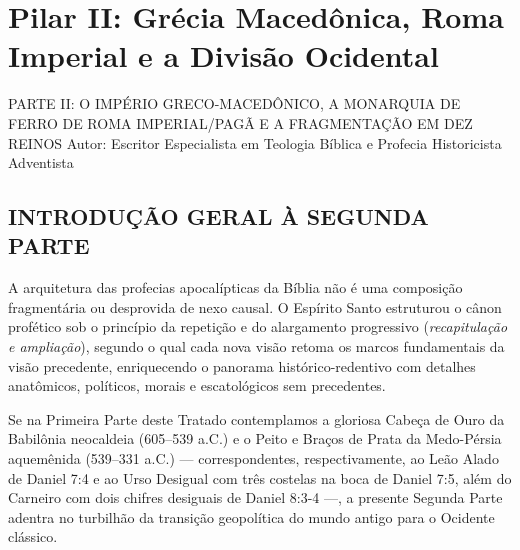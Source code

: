 \chapter{Pilar II: Grécia Macedônica, Roma Imperial e a Divisão Ocidental}

PARTE II: O IMPÉRIO GRECO-MACEDÔNICO, A MONARQUIA DE FERRO DE ROMA IMPERIAL/PAGÃ E A FRAGMENTAÇÃO EM DEZ REINOS
Autor: Escritor Especialista em Teologia Bíblica e Profecia Historicista Adventista


\section{INTRODUÇÃO GERAL À SEGUNDA PARTE}


A arquitetura das profecias apocalípticas da Bíblia não é uma composição fragmentária ou desprovida de nexo causal. O Espírito Santo estruturou o cânon profético sob o princípio da repetição e do alargamento progressivo (\textit{recapitulação e ampliação}), segundo o qual cada nova visão retoma os marcos fundamentais da visão precedente, enriquecendo o panorama histórico-redentivo com detalhes anatômicos, políticos, morais e escatológicos sem precedentes.

Se na Primeira Parte deste Tratado contemplamos a gloriosa Cabeça de Ouro da Babilônia neocaldeia (605–539 a.C.) e o Peito e Braços de Prata da Medo-Pérsia aquemênida (539–331 a.C.) — correspondentes, respectivamente, ao Leão Alado de Daniel 7:4 e ao Urso Desigual com três costelas na boca de Daniel 7:5, além do Carneiro com dois chifres desiguais de Daniel 8:3-4 —, a presente Segunda Parte adentra no turbilhão da transição geopolítica do mundo antigo para o Ocidente clássico.

